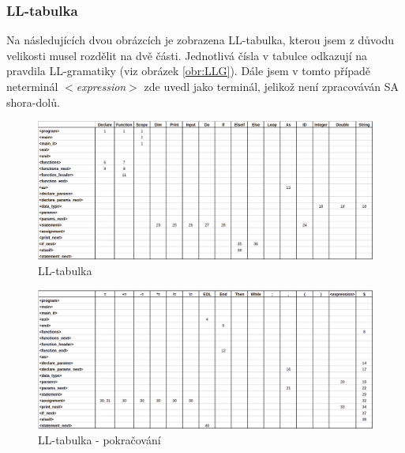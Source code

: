 \documentclass[11pt,a4paper]{article}
\begin{document}
        \newpage

        \subsubsection{LL-tabulka} \label{LL_Tabulka}

            Na následujících dvou obrázcích je zobrazena LL-tabulka, kterou jsem z důvodu velikosti musel rozdělit na dvě části. Jednotlivá čísla v tabulce odkazují na pravdila LL-gramatiky (viz obrázek \ref{obr:LLG}). Dále jsem v tomto případě neterminál \emph{$<$expression$>$} zde uvedl jako terminál, jelikož není zpracováván SA shora-dolů.

            \vspace{1cm}

            \begin{figure}[h!]
                \centering
                \includegraphics[width=17cm]{LLTable.png}
                \caption{LL-tabulka}
                \label{obr:LLT1}
            \end{figure}


            \begin{figure}[h!]
                \centering
                \includegraphics[width=17cm]{LLTable2.png}
                \caption{LL-tabulka - pokračování}
                \label{obr:LLT2}
            \end{figure}

        \newpage
\end{document}
